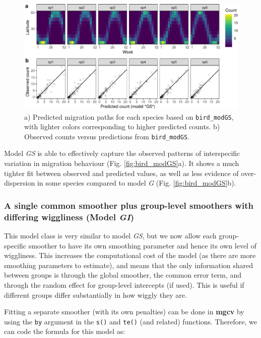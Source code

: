 \documentclass[12pt]{article}
\begin{document}
\begin{figure}
\includegraphics[width=\linewidth]{../figures/bird_modGS_ggplot-1} \caption{\label{fig:bird_modGS}a) Predicted migration paths for each species based on \texttt{bird\_modGS}, with lighter colors corresponding to higher predicted counts. b) Observed counts versus predictions from \texttt{bird\_modGS}.}\label{fig:bird_modGS_ggplot}
\end{figure}

Model \emph{GS} is able to effectively capture the observed patterns of
interspecific variation in migration behaviour (Fig.
\ref{fig:bird_modGS}a). It shows a much tighter fit between observed and
predicted values, as well as less evidence of over-dispersion in some
species compared to model \emph{G} (Fig. \ref{fig:bird_modGS}b).

\subsubsection{\texorpdfstring{A single common smoother plus group-level
smoothers with differing wiggliness (Model
\emph{GI})}{A single common smoother plus group-level smoothers with differing wiggliness (Model GI)}}\label{a-single-common-smoother-plus-group-level-smoothers-with-differing-wiggliness-model-gi}

This model class is very similar to model \emph{GS}, but we now allow
each group-specific smoother to have its own smoothing parameter and
hence its own level of wiggliness. This increases the computational cost
of the model (as there are more smoothing parameters to estimate), and
means that the only information shared between groups is through the
global smoother, the common error term, and through the random effect
for group-level intercepts (if used). This is useful if different groups
differ substantially in how wiggly they are.

Fitting a separate smoother (with its own penalties) can be done in
\textbf{mgcv} by using the \texttt{by} argument in the \texttt{s()} and
\texttt{te()} (and related) functions. Therefore, we can code the
formula for this model as:
\end{document}
